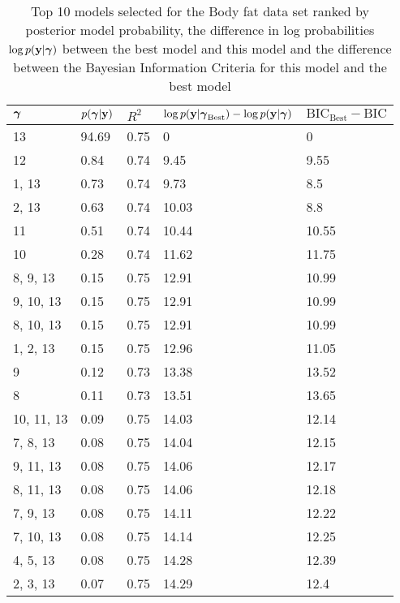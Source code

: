 \documentclass{amsart}
\begin{document}
\begin{table}
\label{tab:numerical_results_bodyfat}
\caption{Top 10 models selected for the Body fat data set ranked by posterior model probability, the difference
					in log probabilities $\log p({\bf y}|{\boldsymbol \gamma})$ between the best model and this model and the difference
					between the Bayesian Information Criteria for this model and the best model}
\begin{tabular}{|l|llll|}
\hline
${\boldsymbol \gamma}$ & $p({\boldsymbol \gamma}|{\bf y})$ & $R^2$ & $\log p({\bf y} | {\boldsymbol \gamma}_\text{Best}) - \log p({\bf y} | {\boldsymbol \gamma})$ & $\text{BIC}_\text{Best} - \text{BIC}$ \\
\hline
13&  94.69&  0.75&  0&  0\\
12&  0.84&  0.74&  9.45&  9.55\\
1, 13&  0.73&  0.74&  9.73&  8.5\\
2, 13&  0.63&  0.74&  10.03&  8.8\\
11&  0.51&  0.74&  10.44&  10.55\\
10&  0.28&  0.74&  11.62&  11.75\\
8, 9, 13&  0.15&  0.75&  12.91&  10.99\\
9, 10, 13&  0.15&  0.75&  12.91&  10.99\\
8, 10, 13&  0.15&  0.75&  12.91&  10.99\\
1, 2, 13&  0.15&  0.75&  12.96&  11.05\\
9&  0.12&  0.73&  13.38&  13.52\\
8&  0.11&  0.73&  13.51&  13.65\\
10, 11, 13&  0.09&  0.75&  14.03&  12.14\\
7, 8, 13&  0.08&  0.75&  14.04&  12.15\\
9, 11, 13&  0.08&  0.75&  14.06&  12.17\\
8, 11, 13&  0.08&  0.75&  14.06&  12.18\\
7, 9, 13&  0.08&  0.75&  14.11&  12.22\\
7, 10, 13&  0.08&  0.75&  14.14&  12.25\\
4, 5, 13&  0.08&  0.75&  14.28&  12.39\\
2, 3, 13&  0.07&  0.75&  14.29&  12.4\\
\hline
\end{tabular}
\end{table}
\end{document}
